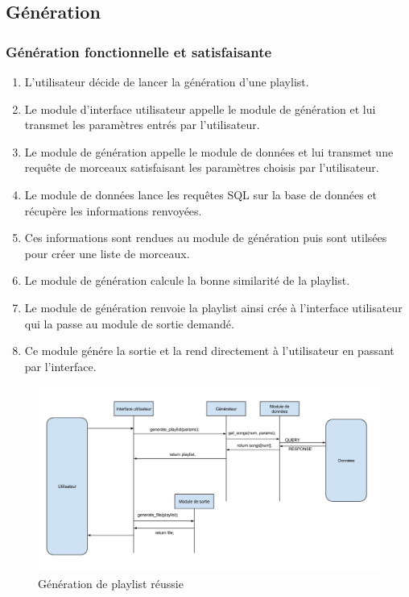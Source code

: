 \subsection{Génération}

\subsubsection{Génération fonctionnelle et satisfaisante}

\begin{enumerate}
\item L'utilisateur décide de lancer la génération d'une playlist.
\item Le module d'interface utilisateur appelle le module de génération et 
lui transmet les paramètres entrés par l'utilisateur.
\item Le module de génération appelle le module de données et lui transmet 
une requête de morceaux satisfaisant les paramètres choisis par l'utilisateur.
\item Le module de données lance les requêtes SQL sur la base de données et
récupère les informations renvoyées.
\item Ces informations sont rendues au module de génération puis sont 
utilsées pour créer une liste de morceaux.
\item Le module de génération calcule la bonne similarité de la playlist.
\item Le module de génération renvoie la playlist ainsi crée à l'interface 
utilisateur qui la passe au module de sortie demandé.
\item Ce module génére la sortie et la rend directement à l'utilisateur en 
passant par l'interface.
\end{enumerate}

\begin{figure}[!h]
\includegraphics[width=14cm]{data/generation_fonctionnel.png}
\caption{Génération de playlist réussie}
\end{figure}

